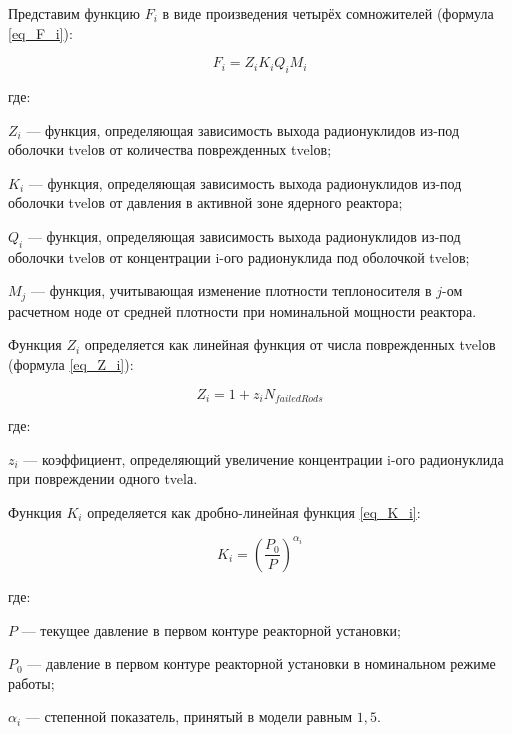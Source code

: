 Представим функцию $F_{i}$ в виде произведения четырёх сомножителей (формула \ref{eq_F_i}):

\begin{equation}
    \label{eq_F_i}
    F_{i} = Z_{i}K_{i}Q_{i}M_{i}
\end{equation}

где:
\begin{description}
    \item $Z_{i}$ --- функция, определяющая зависимость выхода радионуклидов из-под оболочки \ac{tvel}ов от количества 
        поврежденных \ac{tvel}ов;
    \item $K_{i}$ --- функция, определяющая зависимость выхода радионуклидов из-под оболочки \ac{tvel}ов от давления в 
        активной зоне ядерного реактора;
    \item $Q_{i}$ --- функция, определяющая зависимость выхода радионуклидов из-под оболочки \ac{tvel}ов от концентрации 
        i-ого радионуклида под оболочкой \ac{tvel}ов;
    \item $M_{j}$ --- функция, учитывающая изменение плотности теплоносителя в $j$-ом расчетном ноде от средней 
        плотности при номинальной мощности реактора.
\end{description}

Функция $Z_{i}$ определяется как линейная функция от числа поврежденных \ac{tvel}ов (формула \ref{eq_Z_i}):

\begin{equation}
    \label{eq_Z_i}
    Z_{i} = 1 + z_{i}N_{failedRods}
\end{equation}

где:
\begin{description}
    \item $z_{i}$ --- коэффициент, определяющий увеличение концентрации  i-ого радионуклида при повреждении одного 
        \ac{tvel}а.
\end{description}

Функция $K_{i}$ определяется как дробно-линейная функция \ref{eq_K_i}:

\begin{equation}
    \label{eq_K_i}
    K_{i} = (\frac{P_{0}}{P})^{\alpha_{i}}
\end{equation}

где:
\begin{description}
    \item $P$ --- текущее давление в первом контуре реакторной установки;
    \item $P_{0}$ --- давление в первом контуре реакторной установки в номинальном режиме работы;
    \item $\alpha_{i}$ --- степенной показатель, принятый в модели равным $1,5$.
\end{description}

